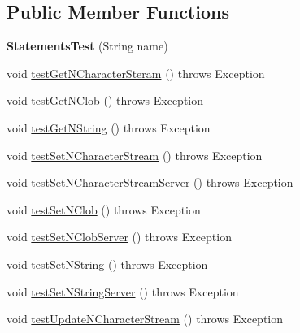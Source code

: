 \subsection*{Public Member Functions}
\begin{DoxyCompactItemize}
\item 
\mbox{\label{classtestsuite_1_1simple_1_1jdbc4_1_1_statements_test_ac0f89fa44cad27fb246ccbd2e2962805}} 
{\bfseries Statements\+Test} (String name)
\item 
void \mbox{\hyperlink{classtestsuite_1_1simple_1_1jdbc4_1_1_statements_test_a3f8a03b3e0f6b2b37f81692a35fa407e}{test\+Get\+N\+Character\+Steram}} ()  throws Exception 
\item 
void \mbox{\hyperlink{classtestsuite_1_1simple_1_1jdbc4_1_1_statements_test_ab65294c85bd8e5cb6609737cded4d1f4}{test\+Get\+N\+Clob}} ()  throws Exception 
\item 
void \mbox{\hyperlink{classtestsuite_1_1simple_1_1jdbc4_1_1_statements_test_aab4d823d722dcad1bf5c8b79bb30b480}{test\+Get\+N\+String}} ()  throws Exception 
\item 
void \mbox{\hyperlink{classtestsuite_1_1simple_1_1jdbc4_1_1_statements_test_a548a1813984e179f0d65e33c469a703e}{test\+Set\+N\+Character\+Stream}} ()  throws Exception 
\item 
void \mbox{\hyperlink{classtestsuite_1_1simple_1_1jdbc4_1_1_statements_test_a76cf0f0b7452ea81236f76be1a364bc8}{test\+Set\+N\+Character\+Stream\+Server}} ()  throws Exception 
\item 
void \mbox{\hyperlink{classtestsuite_1_1simple_1_1jdbc4_1_1_statements_test_a946cfd4eed763dc58a94d0d94680d99b}{test\+Set\+N\+Clob}} ()  throws Exception 
\item 
void \mbox{\hyperlink{classtestsuite_1_1simple_1_1jdbc4_1_1_statements_test_a93dfefc550554c23561b28526f6b0edd}{test\+Set\+N\+Clob\+Server}} ()  throws Exception 
\item 
void \mbox{\hyperlink{classtestsuite_1_1simple_1_1jdbc4_1_1_statements_test_afa4aa777982a0addf47b028f9c4ac95f}{test\+Set\+N\+String}} ()  throws Exception 
\item 
void \mbox{\hyperlink{classtestsuite_1_1simple_1_1jdbc4_1_1_statements_test_a2f3539624112041a12ea62485160053a}{test\+Set\+N\+String\+Server}} ()  throws Exception 
\item 
void \mbox{\hyperlink{classtestsuite_1_1simple_1_1jdbc4_1_1_statements_test_a2c6be7240a79a2caec479bc4a865dd83}{test\+Update\+N\+Character\+Stream}} ()  throws Exception 

\end{DoxyCompactItemize}

